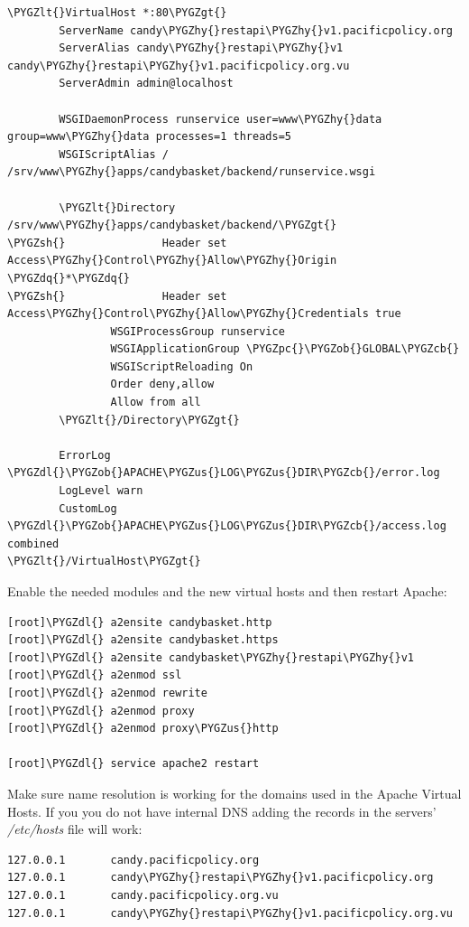 \documentclass[letterpaper,10pt,english]{sphinxmanual}
\def\PYGZus{\char`\_}
\def\PYGZob{\char`\{}
\def\PYGZcb{\char`\}}
\def\PYGZlt{\char`\<}
\def\PYGZgt{\char`\>}
\def\PYGZsh{\char`\#}
\def\PYGZpc{\char`\%}
\def\PYGZdl{\char`\$}
\def\PYGZhy{\char`\-}
\def\PYGZdq{\char`\"}
\begin{document}
\begin{Verbatim}[commandchars=\\\{\}]
\PYGZlt{}VirtualHost *:80\PYGZgt{}
        ServerName candy\PYGZhy{}restapi\PYGZhy{}v1.pacificpolicy.org
        ServerAlias candy\PYGZhy{}restapi\PYGZhy{}v1 candy\PYGZhy{}restapi\PYGZhy{}v1.pacificpolicy.org.vu
        ServerAdmin admin@localhost

        WSGIDaemonProcess runservice user=www\PYGZhy{}data group=www\PYGZhy{}data processes=1 threads=5
        WSGIScriptAlias / /srv/www\PYGZhy{}apps/candybasket/backend/runservice.wsgi

        \PYGZlt{}Directory /srv/www\PYGZhy{}apps/candybasket/backend/\PYGZgt{}
\PYGZsh{}               Header set Access\PYGZhy{}Control\PYGZhy{}Allow\PYGZhy{}Origin \PYGZdq{}*\PYGZdq{}
\PYGZsh{}               Header set Access\PYGZhy{}Control\PYGZhy{}Allow\PYGZhy{}Credentials true
                WSGIProcessGroup runservice
                WSGIApplicationGroup \PYGZpc{}\PYGZob{}GLOBAL\PYGZcb{}
                WSGIScriptReloading On
                Order deny,allow
                Allow from all
        \PYGZlt{}/Directory\PYGZgt{}

        ErrorLog \PYGZdl{}\PYGZob{}APACHE\PYGZus{}LOG\PYGZus{}DIR\PYGZcb{}/error.log
        LogLevel warn
        CustomLog \PYGZdl{}\PYGZob{}APACHE\PYGZus{}LOG\PYGZus{}DIR\PYGZcb{}/access.log combined
\PYGZlt{}/VirtualHost\PYGZgt{}
\end{Verbatim}

Enable the needed modules and the new virtual hosts and then restart Apache:

\begin{Verbatim}[commandchars=\\\{\}]
[root]\PYGZdl{} a2ensite candybasket.http
[root]\PYGZdl{} a2ensite candybasket.https
[root]\PYGZdl{} a2ensite candybasket\PYGZhy{}restapi\PYGZhy{}v1
[root]\PYGZdl{} a2enmod ssl
[root]\PYGZdl{} a2enmod rewrite
[root]\PYGZdl{} a2enmod proxy
[root]\PYGZdl{} a2enmod proxy\PYGZus{}http

[root]\PYGZdl{} service apache2 restart
\end{Verbatim}

Make sure name resolution is working for the domains used in the
Apache Virtual Hosts. If you you do not have internal DNS adding the
records in the servers' \emph{/etc/hosts} file will work:

\begin{Verbatim}[commandchars=\\\{\}]
127.0.0.1       candy.pacificpolicy.org
127.0.0.1       candy\PYGZhy{}restapi\PYGZhy{}v1.pacificpolicy.org
127.0.0.1       candy.pacificpolicy.org.vu
127.0.0.1       candy\PYGZhy{}restapi\PYGZhy{}v1.pacificpolicy.org.vu
\end{Verbatim}
\end{document}
